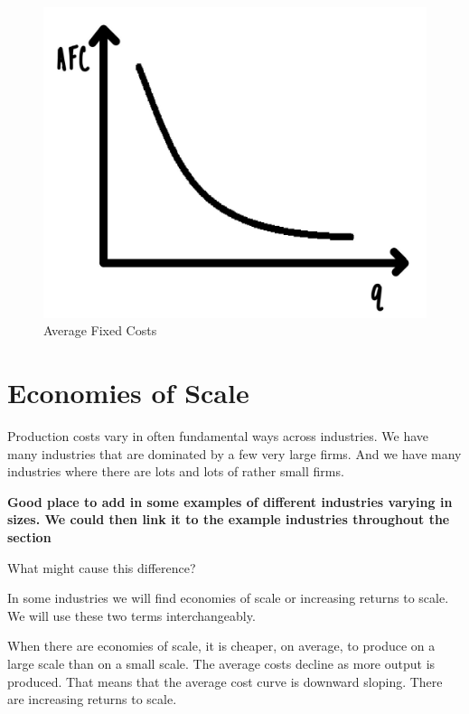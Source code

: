 \documentclass[
]{book}
\begin{document}
\begin{figure}

{\centering \includegraphics[width=0.75\linewidth]{img/supply/fig1} 

}

\caption{Average Fixed Costs}\label{fig:supply01}
\end{figure}

\hypertarget{economies-of-scale}{%
\section{Economies of Scale}\label{economies-of-scale}}

Production costs vary in often fundamental ways across industries. We have many industries that are dominated by a few very large firms. And we have many industries where there are lots and lots of rather small firms.

\begin{addition}
\textbf{Good place to add in some examples of different industries varying in sizes. We could then link it to the example industries throughout the section}

\end{addition}

What might cause this difference?

In some industries we will find economies of scale or increasing returns to scale. We will use these two terms interchangeably.

When there are economies of scale, it is cheaper, on average, to produce on a large scale than on a small scale. The average costs decline as more output is produced. That means that the average cost curve is downward sloping. There are increasing returns to scale.
\end{document}
